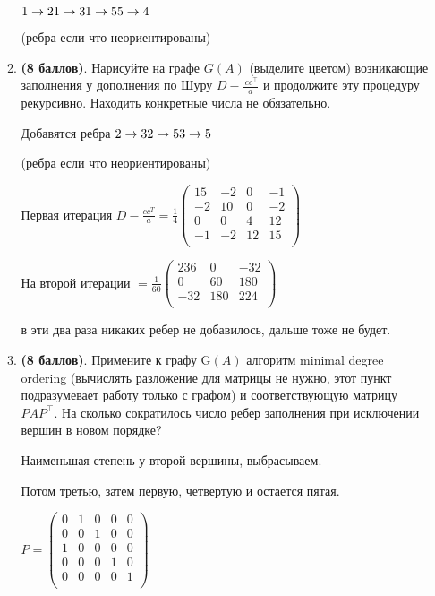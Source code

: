 \documentclass[a4paper, 11pt]{article}
\newcommand{\prob}[1]{\item \textbf{(#1 баллов)}.}
\begin{document}
\begin{enumerate}
\begin{enumerate}
			$1 \to 2  \\ 1 \to 3 \\  1 \to 5 \\  5 \to 4$
			
			(ребра если что неориентированы)
			
			\prob{8} Нарисуйте на графе $G(A)$ (выделите цветом) возникающие заполнения у дополнения по Шуру $D-\frac{~cc^{\top}}{a}$ и продолжите эту процедуру рекурсивно. Находить конкретные числа не обязательно.
			
			Добавятся ребра $2 \to 3 \\ 2 \to 5  \\ 3 \to 5$
			
			(ребра если что неориентированы)
			
			Первая итерация $D - \frac{cc^T}{a} = \frac{1}{4} \begin{pmatrix}
				15 & -2 & 0 & -1 \\
				-2 & 10 & 0 & -2 \\
				0 & 0 & 4 & 12 \\
				-1 & -2 & 12 & 15 \\
			\end{pmatrix}$
			
			
			На второй итерации $= \frac{1}{60} \begin{pmatrix}
				236 & 0 & -32 \\
				0 & 60 & 180 \\
				-32 & 180 & 224 \\
			\end{pmatrix}$
			
			в эти два раза никаких ребер не добавилось, дальше тоже не будет.
			
			\prob{8} Примените к графу G$(A)$ алгоритм minimal degree ordering (вычислять разложение для матрицы не нужно, этот пункт подразумевает работу только с графом) и соответствующую матрицу $PAP^\top$. На сколько сократилось число ребер заполнения при исключении вершин в новом порядке?
			
			Наименьшая степень у второй вершины, выбрасываем. 
			
			Потом третью, затем первую, четвертую и остается пятая.
			
			$P = \begin{pmatrix}
				0 & 1 & 0 & 0 & 0 \\
				0 & 0 & 1 & 0 & 0 \\
				1 & 0 & 0 & 0 & 0 \\
				0 & 0 & 0 & 1 & 0 \\
				0 & 0 & 0 & 0 & 1 \\
			\end{pmatrix}$
			

\end{enumerate}
\end{enumerate}
\end{document}
